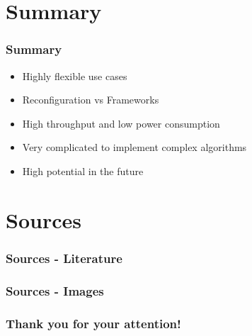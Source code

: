 \documentclass{beamer}
\begin{document}
\section{Summary}
\begin{frame}
	\frametitle{Summary}
	\begin{itemize}
		\item Highly flexible use cases
		\item Reconfiguration vs Frameworks
		\item High throughput and low power consumption
		\item Very complicated to implement complex algorithms
		\item High potential in the future
	\end{itemize}
\end{frame}

\section{Sources}
\begin{frame}
	\frametitle{Sources - Literature}
\end{frame}

\begin{frame}
\frametitle{Sources - Images}
\end{frame}

\begin{frame}
    \frametitle{Thank you for your attention!}
\end{frame}
\end{document}
